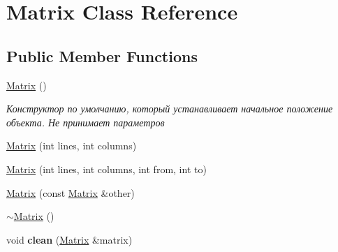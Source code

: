 \hypertarget{class_matrix}{\section{Matrix Class Reference}
\label{class_matrix}
}
\subsection*{Public Member Functions}
\begin{DoxyCompactItemize}
\item 
\hypertarget{class_matrix_a2dba13c45127354c9f75ef576f49269b}{\hyperlink{class_matrix_a2dba13c45127354c9f75ef576f49269b}{Matrix} ()}\label{class_matrix_a2dba13c45127354c9f75ef576f49269b}

\begin{DoxyCompactList}\small\item\em Конструктор по умолчанию, который устанавливает начальное положение объекта. Не принимает параметров \end{DoxyCompactList}\item 
\hyperlink{class_matrix_ad74c6b0c2db846ab723754759c52dad6}{Matrix} (int lines, int columns)
\item 
\hyperlink{class_matrix_a2849a613cdb81050f0c3c7db76e55db2}{Matrix} (int lines, int columns, int from, int to)
\item 
\hyperlink{class_matrix_abcf708e864ed3d9db2c3b317c5e529ab}{Matrix} (const \hyperlink{class_matrix}{Matrix} \&other)
\item 
\hyperlink{class_matrix_a9b1c3627f573d78a2f08623fdfef990f}{$\sim$\-Matrix} ()
\item 
\hypertarget{class_matrix_a91c2e14284da7e56b2155ff4df82fcaf}{void {\bfseries clean} (\hyperlink{class_matrix}{Matrix} \&matrix)}\label{class_matrix_a91c2e14284da7e56b2155ff4df82fcaf}


\end{DoxyCompactItemize}
